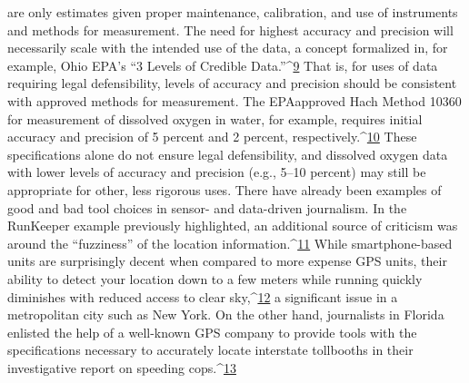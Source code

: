 are only estimates given proper maintenance, calibration, and use of instruments
and methods for measurement. The need for highest accuracy and
precision will necessarily scale with the intended use of the data, a concept formalized in, for example, Ohio EPA's ``3 Levels of Credible Data.''^{\href{#endnotes-stauffer}{9}} That is,
for uses of data requiring legal defensibility, levels of accuracy and precision
should be consistent with approved methods for measurement. The EPAapproved
Hach Method 10360 for measurement of dissolved oxygen in
water, for example, requires initial accuracy and precision of 5 percent and
2 percent, respectively.^{\href{#endnotes-stauffer}{10}} These specifications alone do not ensure legal
defensibility, and dissolved oxygen data with lower levels of accuracy and
precision (e.g., 5–10 percent) may still be appropriate for other, less
rigorous uses.
There have already been examples of good and bad tool choices in sensor-
and data-driven journalism. In the RunKeeper example previously
highlighted, an additional source of criticism was around the ``fuzziness'' of
the location information.^{\href{#endnotes-stauffer}{11}} While smartphone-based units are surprisingly
decent when compared to more expense GPS units, their ability to detect
your location down to a few meters while running quickly diminishes with
reduced access to clear sky,^{\href{#endnotes-stauffer}{12}} a significant issue in a metropolitan city such
as New York. On the other hand, journalists in Florida enlisted the help of
a well-known GPS company to provide tools with the specifications necessary
to accurately locate interstate tollbooths in their investigative report on
speeding cops.^{\href{#endnotes-stauffer}{13}}

